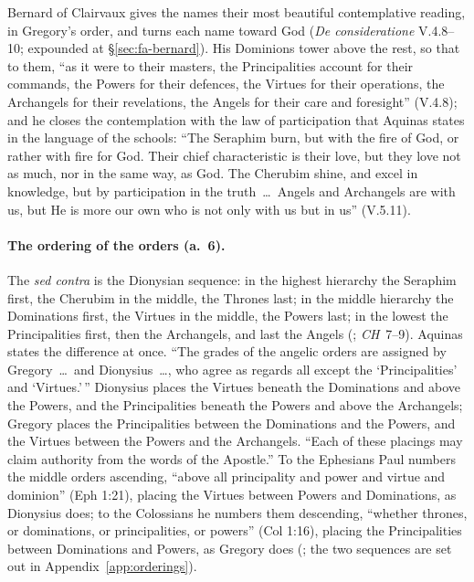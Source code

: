 Bernard of Clairvaux gives the names their most beautiful contemplative
reading, in Gregory's order, and turns each name toward God (\emph{De
consideratione} V.4.8--10; expounded at \S\ref{sec:fa-bernard}). His
Dominions tower above the rest, so that to them, ``as it were to their
masters, the Principalities account for their commands, the Powers for their
defences, the Virtues for their operations, the Archangels for their
revelations, the Angels for their care and foresight'' (V.4.8); and he closes
the contemplation with the law of participation that Aquinas states in the
language of the schools: ``The Seraphim burn, but with the fire of God, or rather with fire for God. Their
chief characteristic is their love, but they love not as much, nor in the
same way, as God. The Cherubim shine, and excel in knowledge, but by
participation in the truth~\dots\ Angels and Archangels are with us, but He
is more our own who is not only with us but in us'' (V.5.11).

\paragraph{The ordering of the orders (a.~6).} The \emph{sed contra} is the
Dionysian sequence: in the highest hierarchy the Seraphim first, the
Cherubim in the middle, the Thrones last; in the middle hierarchy the
Dominations first, the Virtues in the middle, the Powers last; in the lowest
the Principalities first, then the Archangels, and last the Angels (; \emph{CH}~7--9). Aquinas states the difference at once.
``The grades of the angelic orders are assigned by Gregory~\dots\ and
Dionysius~\dots, who agree as regards all except the `Principalities' and
`Virtues.'\,'' Dionysius places the Virtues beneath the Dominations and above
the Powers, and the Principalities beneath the Powers and above the
Archangels; Gregory places the Principalities between the Dominations and
the Powers, and the Virtues between the Powers and the Archangels. ``Each of
these placings may claim authority from the words of the Apostle.'' To the
Ephesians Paul numbers the middle orders ascending, ``above all principality
and power and virtue and dominion'' (Eph 1:21), placing the Virtues between
Powers and Dominations, as Dionysius does; to the Colossians he numbers them
descending, ``whether thrones, or dominations, or principalities, or powers''
(Col 1:16), placing the Principalities between Dominations and Powers, as
Gregory does (; the two sequences are set out in
Appendix~\ref{app:orderings}).

